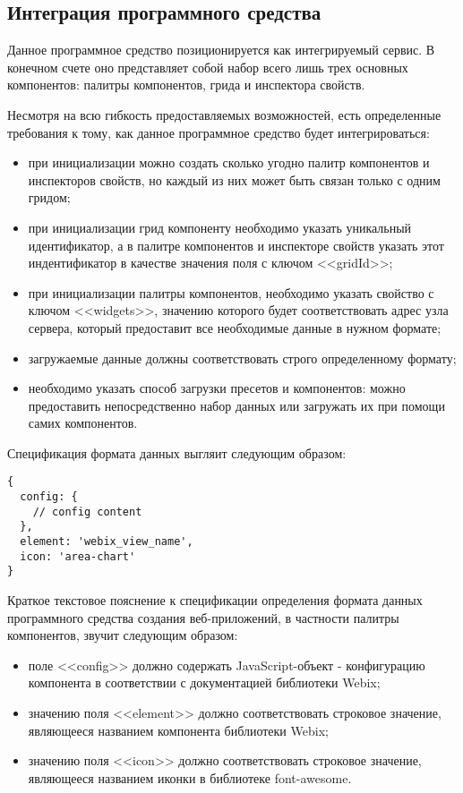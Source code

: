 \subsection{Интеграция программного средства}
\label{sec:manual:integration}

Данное программное средство позиционируется как интегрируемый сервис. В конечном счете оно представляет собой набор всего лишь трех основных компонентов: палитры компонентов, грида и инспектора свойств. 

Несмотря на всю гибкость предоставляемых возможностей, есть определенные требования к тому, как данное программное средство будет интегрироваться:
\begin{itemize}
	\item при инициализации можно создать сколько угодно палитр компонентов и инспекторов свойств, но каждый из них может быть связан только с одним гридом;
	\item при инициализации грид компоненту необходимо указать уникальный идентификатор, а в палитре компонентов и инспекторе свойств указать этот индентификатор в качестве значения поля с ключом <<gridId>>;
	\item при инициализации палитры компонентов, необходимо указать свойство с ключом <<widgets>>, значению которого будет соответствовать адрес узла сервера, который предоставит все необходимые данные в нужном формате;
	\item загружаемые данные должны соответствовать строго определенному формату;
	\item необходимо указать способ загрузки пресетов и компонентов: можно предоставить непосредственно набор данных или загружать их при помощи самих компонентов. 
\end{itemize}

Спецификация формата данных выгляит следующим образом:
\begin{lstlisting}
{
  config: { 
    // config content
  },
  element: 'webix_view_name',
  icon: 'area-chart'
}
\end{lstlisting}

Краткое текстовое пояснение к спецификации определения формата данных программного средства создания веб-приложений, в частности палитры компонентов, звучит следующим образом:
\begin{itemize}
	\item поле <<config>> должно содержать JavaScript-объект - конфигурацию компонента в соответствии с документацией библиотеки Webix;
	\item значению поля <<element>> должно соответствовать строковое значение, являющееся названием компонента библиотеки Webix;
	\item значению поля <<icon>> должно соответствовать строковое значение, являющееся названием иконки в библиотеке font-awesome.
\end{itemize}

